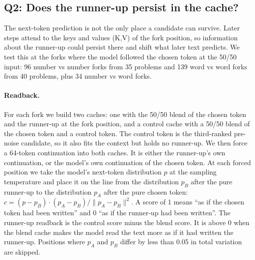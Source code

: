 \subsection{Q2: Does the runner-up persist in the cache?}\label{sec:q2}

The next-token prediction is not the only place a candidate can survive.
Later steps attend to the keys and values (K,V) of the fork position, so information about the runner-up could
persist there and shift what later text predicts.
We test this at the forks where the model followed the chosen token at the 50/50 input:
96 number vs number forks from 35 problems and 139 word vs word forks from 40 problems, %
plus 34 number vs word forks. %

\paragraph{Readback.}
For each fork we build two caches: one with the 50/50 blend of the chosen token and the runner-up at the fork
position, and a control cache with a 50/50 blend of the chosen token and a control token.
The control token is the third-ranked pre-noise candidate, so it also fits the context but holds no runner-up.
We then force a 64-token continuation into both caches. %
It is either the runner-up's own continuation, or the model's own continuation of the chosen token.
At each forced position we take the model's next-token distribution $p$ at the sampling temperature and place it
on the line from the distribution $p_B$ after the pure runner-up to the distribution $p_A$ after the pure chosen token:
$c = (p - p_B)\cdot(p_A - p_B) / \lVert p_A - p_B\rVert^2$. %
A score of 1 means ``as if the chosen token had been written'' and 0 ``as if the runner-up had been written''.
The runner-up readback is the control score minus the blend score.
It is above 0 when the blend cache makes the model read the text more as if it had written the runner-up.
Positions where $p_A$ and $p_B$ differ by less than 0.05 in total variation are skipped. %

